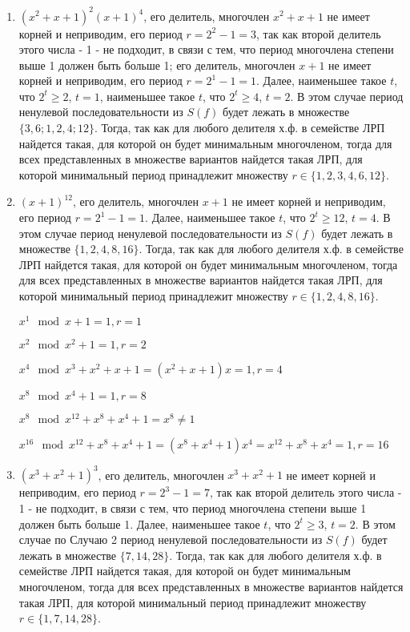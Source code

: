 \documentclass[12pt]{extarticle}
\begin{document}
\begin{enumerate}
    \item $(x^2+x+1)^2(x+1)^4$, его делитель, многочлен $x^2+x+1$ не имеет корней и неприводим, его период $r = 2^2 -1 = 3$, так как второй делитель этого числа - 1 - не подходит, в связи с тем, что период многочлена степени выше 1 должен быть больше 1; его делитель, многочлен $x+1$ не имеет корней и неприводим, его период $r = 2^1 -1 = 1$. Далее, наименьшее такое $t$, что $2^t \geq 2$, $t=1$, наименьшее такое $t$, что $2^t \geq 4$, $t=2$. В этом случае период ненулевой последовательности из $S(f)$ будет лежать в множестве $\{3, 6; 1, 2, 4; 12\}$. Тогда, так как для любого делителя х.ф. в семействе ЛРП найдется такая, для которой он будет минимальным многочленом, тогда для всех представленных в множестве вариантов найдется такая ЛРП, для которой минимальный период принадлежит множеству $r \in \{1,2,3,4,6,12 \}$.
    \item $(x+1)^{12}$, его делитель, многочлен $x+1$ не имеет корней и неприводим, его период $r = 2^1 -1 = 1$. Далее, наименьшее такое $t$, что $2^t \geq 12$, $t=4$. В этом случае период ненулевой последовательности из $S(f)$ будет лежать в множестве $\{1, 2, 4, 8, 16\}$. Тогда, так как для любого делителя х.ф. в семействе ЛРП найдется такая, для которой он будет минимальным многочленом, тогда для всех представленных в множестве вариантов найдется такая ЛРП, для которой минимальный период принадлежит множеству $r \in \{1, 2, 4, 8, 16\}$.
    
    $x^1 \mod x+1 = 1, r = 1$
    
    $x^2 \mod x^2+1 = 1, r = 2$
    
    $x^4 \mod x^3 + x^2 + x +1 = (x^2 + x + 1) x = 1, r = 4$
    
    $x^8 \mod x^4+1 = 1, r = 8$
    
    $x^8 \mod x^12 +x^8 + x^4 + 1 = x^8 \neq 1$
    
    $x^{16} \mod x^{12} +x^8 + x^4 + 1 = (x^8 + x^4 + 1) x^4 = x^{12} + x^8 + x^4 = 1, r = 16 $
    
    \item $(x^3+x^2+1)^3$, его делитель, многочлен $x^3+x^2+1$ не имеет корней и неприводим, его период $r = 2^3 -1 = 7$, так как второй делитель этого числа - 1 - не подходит, в связи с тем, что период многочлена степени выше 1 должен быть больше 1. Далее, наименьшее такое $t$, что $2^t \geq 3$, $t=2$. В этом случае по Случаю 2 период ненулевой последовательности из $S(f)$ будет лежать в множестве $\{7, 14, 28\}$. Тогда, так как для любого делителя х.ф. в семействе ЛРП найдется такая, для которой он будет минимальным многочленом, тогда для всех представленных в множестве вариантов найдется такая ЛРП, для которой минимальный период принадлежит множеству $r \in \{1, 7, 14, 28\}$. 
    

\end{enumerate}
\end{document}

